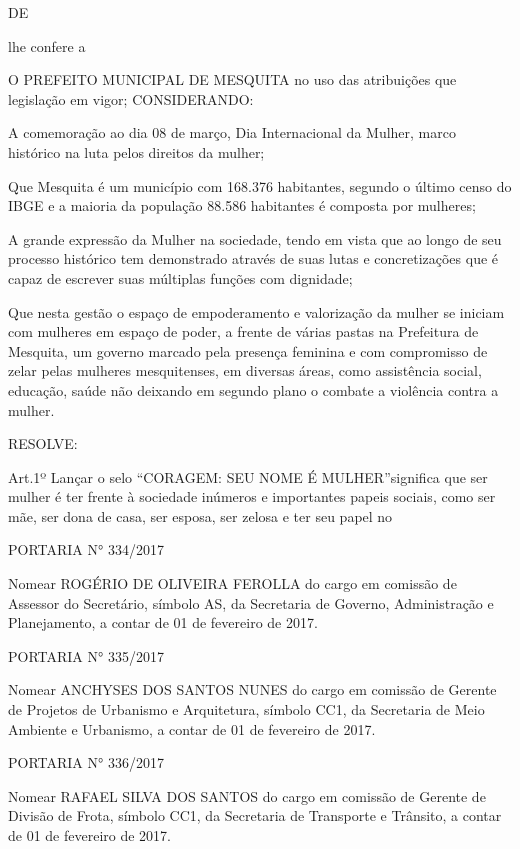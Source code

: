 \documentclass{doliberto}
\begin{document}
DE 

lhe  confere  a 

O  PREFEITO  MUNICIPAL  DE  MESQUITA  no  uso  das 
atribuições  que 
legislação  em  vigor; 
CONSIDERANDO: 
 
A  comemoração  ao  dia  08  de  março,  Dia  Internacional  da 
Mulher, marco histórico na luta pelos direitos da mulher; 
 
Que  Mesquita  é  um  município  com  168.376  habitantes, 
segundo o último censo do  IBGE e a  maioria da população 
88.586 habitantes é composta por mulheres; 
 
A grande expressão da Mulher na sociedade, tendo em vista 
que  ao  longo  de  seu  processo  histórico  tem  demonstrado 
através  de  suas  lutas  e  concretizações  que  é  capaz  de 
escrever suas múltiplas funções com dignidade; 

Que nesta gestão o espaço de empoderamento e valorização 
da mulher se iniciam com mulheres em espaço de poder, a 
frente  de  várias  pastas  na  Prefeitura  de  Mesquita,  um 
governo  marcado  pela  presença 
feminina  e  com 
compromisso  de  zelar  pelas  mulheres  mesquitenses,  em 
diversas  áreas,  como  assistência  social,  educação,  saúde 
não  deixando  em  segundo  plano  o  combate  a  violência 
contra a mulher.  

RESOLVE:  

Art.1º  Lançar  o  selo 
“CORAGEM:  SEU  NOME  É 
MULHER”significa que ser mulher é ter frente à sociedade 
inúmeros  e  importantes  papeis  sociais,  como  ser  mãe,  ser 
dona  de  casa,  ser  esposa,  ser  zelosa  e  ter  seu  papel  no 

 

PORTARIA N° 334/2017 

Nomear  ROGÉRIO  DE  OLIVEIRA  FEROLLA  do  cargo  em 
comissão  de  Assessor  do  Secretário,  símbolo  AS,  da 
Secretaria  de  Governo,  Administração  e  Planejamento, 
a contar de 01 de fevereiro de 2017. 

PORTARIA N° 335/2017 

Nomear  ANCHYSES  DOS  SANTOS  NUNES  do  cargo  em 
comissão  de  Gerente  de  Projetos  de  Urbanismo  e 
Arquitetura,  símbolo  CC1,  da  Secretaria  de  Meio 
Ambiente  e  Urbanismo,  a  contar  de  01  de  fevereiro  de 
2017. 

PORTARIA N° 336/2017 

Nomear  RAFAEL  SILVA  DOS  SANTOS  do  cargo  em 
comissão  de  Gerente  de  Divisão  de  Frota,  símbolo  CC1, 
da  Secretaria  de  Transporte  e  Trânsito,  a  contar  de  01 
de fevereiro de 2017. 
\end{document}
